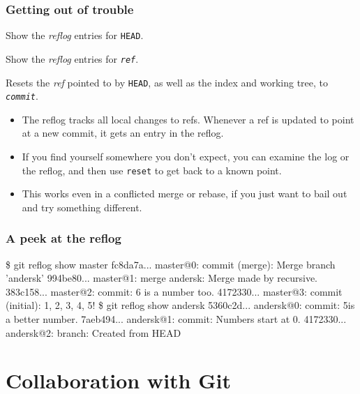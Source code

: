 \documentclass{beamer}
\makeatletter
\newcommand{\sh}[1]{\$ {\color{beamer@blendedblue}#1}}
\makeatother
\begin{document}
\begin{frame}
  \frametitle{Getting out of trouble}
  \begin{description}
  \item[\texttt{git reflog}] Show the \emph{reflog} entries for
    \texttt{HEAD}.
  \item[\texttt{git reflog show \textit{ref}}] Show the \emph{reflog}
    entries for \texttt{\textit{ref}}.
  \item[\texttt{git reset --hard \textit{commit}}] Resets the
    \emph{ref} pointed to by \texttt{HEAD}, as well as the index and
    working tree, to \texttt{\textit{commit}}.
  \end{description}

  \begin{itemize}
  \item The reflog tracks all local changes to refs.  Whenever a ref
    is updated to point at a new commit, it gets an entry in the
    reflog.
  \item If you find yourself somewhere you don't expect, you can
    examine the log or the reflog, and then use \texttt{reset} to get
    back to a known point.
  \item This works even in a conflicted merge or rebase, if you just
    want to bail out and try something different.
  \end{itemize}

\end{frame}

\begin{frame}[fragile]
  \frametitle{A peek at the reflog}
  {\footnotesize
  \begin{semiverbatim}
\sh{git reflog show master}
fc8da7a... master@{0}: commit (merge): Merge branch 'andersk'
994be80... master@{1}: merge andersk: Merge made by recursive.
383c158... master@{2}: commit: 6 is a number too.
4172330... master@{3}: commit (initial): 1, 2, 3, 4, 5!
\sh{git reflog show andersk}
5360c2d... andersk@{0}: commit: 5\textonehalf is a better number.
7aeb494... andersk@{1}: commit: Numbers start at 0.
4172330... andersk@{2}: branch: Created from HEAD
  \end{semiverbatim}}
\end{frame}

\section{Collaboration with Git}
\end{document}
